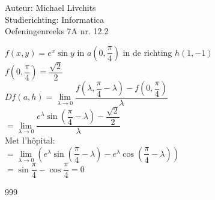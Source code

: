 \documentclass[a4paper]{article}
\begin{document}
  
\noindent \large Auteur: Michael Livchits \\
\noindent \large Studierichting: Informatica\\
\noindent \large Oefeningenreeks 7A nr. 12.2\\

\medskip

\normalsize

$f(x,y) = e^x\sin y$ in $a\left(0,\dfrac{\pi}{4}\right)$ in de richting $h(1,-1)$\\

$f\left(0,\dfrac{\pi}{4}\right) = \dfrac{\sqrt{2}}{2}$\\

$Df(a,h) = \lim\limits_{\lambda\rightarrow 0}\dfrac{f\left(\lambda,\dfrac{\pi}{4}-\lambda\right) - f\left(0,\dfrac{\pi}{4}\right)}{\lambda}$\\

$= \lim\limits_{\lambda\rightarrow 0}\dfrac{e^\lambda\sin\left(\dfrac{\pi}{4}-\lambda\right) - \dfrac{\sqrt{2}}{2}}{\lambda}$\\

Met l'hôpital:\\

$= \lim\limits_{\lambda\rightarrow 0}\left(e^\lambda\sin\left(\dfrac{\pi}{4}-\lambda\right)-e^\lambda\cos\left(\dfrac{\pi}{4}-\lambda\right)\right)$\\

$= \sin\dfrac{\pi}{4} - \cos\dfrac{\pi}{4} = 0$\\

\begin{thebibliography}{999}
\end{thebibliography}
\end{document}
